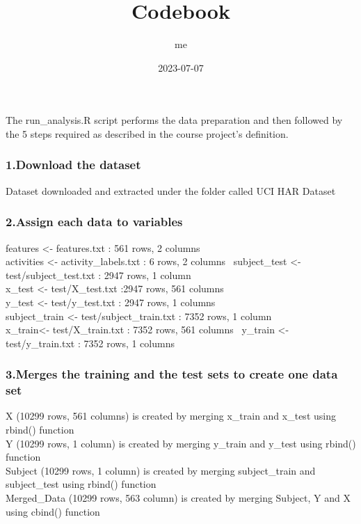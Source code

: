\documentclass[
]{article}
\title{Codebook}
\author{me}
\date{2023-07-07}
\begin{document}
\maketitle

The run\_analysis.R script performs the data preparation and then
followed by the 5 steps required as described in the course project's
definition.

\hypertarget{download-the-dataset}{%
\subsubsection{1.Download the dataset}\label{download-the-dataset}}

Dataset downloaded and extracted under the folder called UCI HAR Dataset

\hypertarget{assign-each-data-to-variables}{%
\subsubsection{2.Assign each data to
variables}\label{assign-each-data-to-variables}}

features \textless- features.txt : 561 rows, 2 columns\\
activities \textless- activity\_labels.txt : 6 rows, 2 columns~
subject\_test \textless- test/subject\_test.txt : 2947 rows, 1 column\\
x\_test \textless- test/X\_test.txt :2947 rows, 561 columns\\
y\_test \textless- test/y\_test.txt : 2947 rows, 1 columns\\
subject\_train \textless- test/subject\_train.txt : 7352 rows, 1
column\\
x\_train\textless- test/X\_train.txt : 7352 rows, 561 columns~ y\_train
\textless- test/y\_train.txt : 7352 rows, 1 columns\\

\hypertarget{merges-the-training-and-the-test-sets-to-create-one-data-set}{%
\subsubsection{3.Merges the training and the test sets to create one
data
set}\label{merges-the-training-and-the-test-sets-to-create-one-data-set}}

X (10299 rows, 561 columns) is created by merging x\_train and x\_test
using rbind() function\\
Y (10299 rows, 1 column) is created by merging y\_train and y\_test
using rbind() function\\
Subject (10299 rows, 1 column) is created by merging subject\_train and
subject\_test using rbind() function\\
Merged\_Data (10299 rows, 563 column) is created by merging Subject, Y
and X using cbind() function\\
\end{document}
